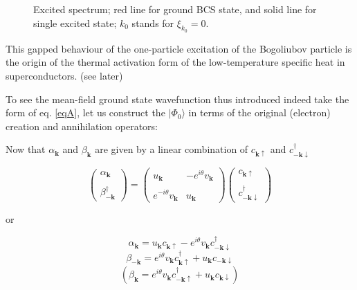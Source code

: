\begin{figure}
\begin{center}
\end{center}
\caption{Excited spectrum; red line for ground BCS state, and solid line for single excited state; $k_0$ stands for $\xi_{k_0} = 0$. }\label{Fig6.3}
\end{figure}

This gapped behaviour of the one-particle excitation of the Bogoliubov particle is the origin of the thermal activation form of the low-temperature specific heat in superconductors. (see later)

To see the mean-field ground state wavefunction thus introduced indeed take the form of eq. \ref{eqA}, let us construct the $|\Phi_0\rangle$ in terms of the original (electron) creation and annihilation operators: 

Now that $\alpha_{\bm{k}}$ and $\beta_{\bm{k}}$ are given by a linear combination of $c_{\bm{k}\uparrow}$ and $c_{-\bm{k}\downarrow}^\dagger$

\[
\left(\begin{matrix}
\alpha_{\bm{k}}\\
\ \\
\beta_{-\bm{k}}^\dagger
\end{matrix}\right) = \left(\begin{matrix}
u_{\bm{k}} & -e^{i\theta}v_{\bm{k}}\\
\ & \ \\
e^{-i\theta}v_{\bm{k}} & u_{\bm{k}}
\end{matrix}\right) \left(\begin{matrix}
c_{\bm{k}\uparrow}\\
\ \\
c_{-\bm{k}\downarrow}^\dagger
\end{matrix}\right) 
 \]

or

\[\alpha_{\bm{k}} = u_{\bm{k}}c_{\bm{k}\uparrow} - e^{i\theta}v_{\bm{k}}c_{-\bm{k}\downarrow}^\dagger \]
\[\beta_{-\bm{k}} = e^{i\theta}v_{\bm{k}}c_{\bm{k}\uparrow}^\dagger + u_{\bm{k}}c_{-\bm{k}\downarrow} \]
\[(\beta_{\bm{k}} = e^{i\theta}v_{\bm{k}}c_{-\bm{k}\uparrow}^\dagger+u_{\bm{k}}c_{\bm{k}\downarrow}) \]

